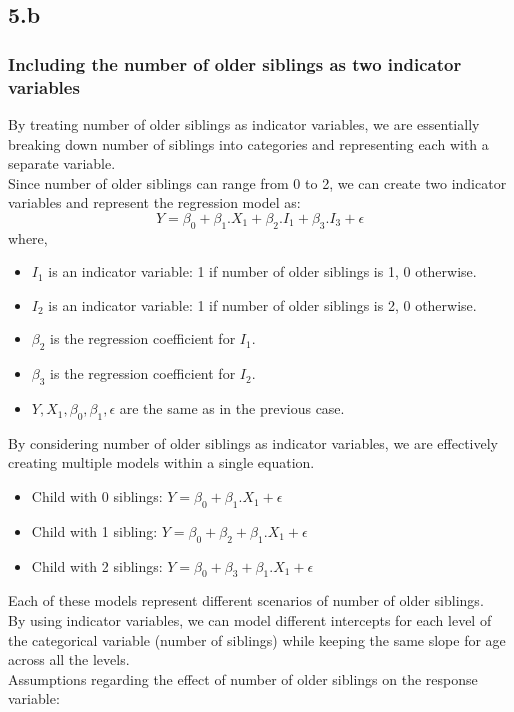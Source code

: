 \documentclass[12pt]{article}
\begin{document}
\newpage
\subsection*{5.b}
\subsubsection*{Including the number of older siblings as two indicator variables}
By treating number of older siblings as indicator variables, we are essentially
breaking down number of siblings into categories and representing each
with a separate variable.
\\
Since number of older siblings can range from 0 to 2, we can create two indicator
variables and represent the regression model as:
\[Y = \beta_0 + \beta_1. X_1 + \beta_2. I_1 + \beta_3. I_3 + \epsilon\]
where,
\begin{itemize}
    \item \(I_1\) is an indicator variable: 1 if number of older siblings is 1, 0 otherwise.
    \item \(I_2\) is an indicator variable: 1 if number of older siblings is 2, 0 otherwise.
    \item \(\beta_2\) is the regression coefficient for \(I_1\).
    \item \(\beta_3\) is the regression coefficient for \(I_2\).
    \item \(Y, X_1, \beta_0, \beta_1, \epsilon\) are the same as in the previous case.
\end{itemize}
By considering number of older siblings as indicator variables,
we are effectively creating multiple models within a single equation.
\begin{itemize}
    \item Child with 0 siblings: \(Y = \beta_0 + \beta_1. X_1 + \epsilon\)
    \item Child with 1 sibling: \(Y = \beta_0 + \beta_2 + \beta_1.X_1 + \epsilon\)
    \item Child with 2 siblings: \(Y = \beta_0 + \beta_3 + \beta_1.X_1 + \epsilon\)
\end{itemize}
Each of these models represent different scenarios of number of older siblings.
\\[\baselineskip]
By using indicator variables, we can model different intercepts for each level
of the categorical variable (number of siblings) while keeping the same slope for
age across all the levels.
\\[\baselineskip]
Assumptions regarding the effect of number of older siblings on the response variable:
\end{document}
